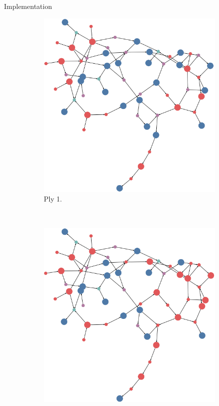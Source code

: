 \documentclass[final]{beamer} %
\begin{document}
\begin{columns}
\begin{column}{.35\textwidth}
\begin{block}{Implementation}
	
		\begin{figure}[!htb]
			\centering
			\begin{subfigure}[!htb]{0.18\columnwidth}
				\centering
				\includegraphics[width=\columnwidth]{figures/knn_backward_think_1.png}
				\caption{Ply 1.}
			\end{subfigure}
			~
			\begin{subfigure}[!htb]{0.18\columnwidth}
				\centering
				\includegraphics[width=\columnwidth]{figures/knn_backward_think_2.png}

\end{subfigure}
\end{figure}
\end{block}
\end{column}
\end{columns}
\end{document}
